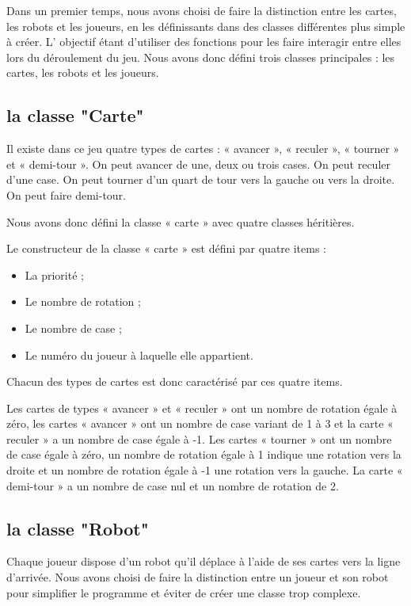 \documentclass[a4paper,12pt]{report}
\begin{document}
Dans un premier temps, nous avons choisi de faire la distinction entre les cartes, les robots et les joueurs, en les définissants dans des classes différentes plus simple à créer. L' objectif étant d'utiliser des fonctions pour les faire interagir entre elles lors du déroulement du jeu.
Nous avons donc défini trois classes principales : les cartes, les robots et les joueurs. 

		\subsection{la classe "Carte"}
	
	Il existe dans ce jeu quatre types de cartes : « avancer », « reculer », « tourner » et « demi-tour ».
On peut avancer de une, deux ou trois cases. On peut reculer d'une case. On peut tourner d’un quart de tour vers la gauche ou vers la droite. On peut faire demi-tour.

Nous avons donc défini la classe « carte » avec quatre classes héritières.

Le constructeur de la classe « carte » est défini par quatre items :
\begin{itemize}
\item La priorité ;
\item Le nombre de rotation ;
\item Le nombre de case ;
\item Le numéro du joueur à laquelle elle appartient.  
\end{itemize}

Chacun des types de cartes est donc caractérisé par ces quatre items.

Les cartes de types « avancer » et « reculer » ont un nombre de rotation égale à zéro, les cartes « avancer » ont un nombre de case variant de 1 à 3 et la carte « reculer » a un nombre de case égale à -1.
Les cartes « tourner » ont un nombre de case égale à zéro, un nombre de rotation égale à 1 indique une rotation vers la droite et un nombre de rotation égale à -1 une rotation vers la gauche.
La carte « demi-tour » a un nombre de case nul et un nombre de rotation de 2.

		\subsection{la classe "Robot"}
	
Chaque joueur dispose d’un robot qu’il déplace à l’aide de ses cartes vers la ligne d’arrivée. Nous avons choisi de faire la distinction entre un joueur et son robot pour simplifier le programme et éviter de créer une classe trop complexe.
\end{document}
